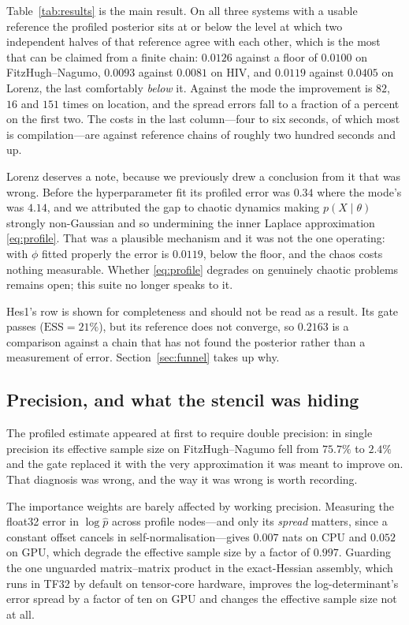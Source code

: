\documentclass[11pt]{article}
\theoremstyle{plain}
\theoremstyle{definition}
\theoremstyle{remark}
\begin{document}
Table~\ref{tab:results} is the main result. On all three systems with a usable reference the
profiled posterior sits at or below the level at which two independent halves of that reference
agree with each other, which is the most that can be claimed from a finite chain: $0.0126$ against
a floor of $0.0100$ on FitzHugh--Nagumo, $0.0093$ against $0.0081$ on HIV, and $0.0119$ against
$0.0405$ on Lorenz, the last comfortably \emph{below} it. Against the mode the improvement is $82$,
$16$ and $151$ times on location, and the spread errors fall to a fraction of a percent on the
first two. The costs in the last column---four to six seconds, of which most is compilation---are against
reference chains of roughly two hundred seconds and up.

Lorenz deserves a note, because we previously drew a conclusion from it that was wrong. Before the
hyperparameter fit its profiled error was $0.34$ where the mode's was $4.14$, and we attributed the
gap to chaotic dynamics making $p(X\mid\theta)$ strongly non-Gaussian and so undermining the inner
Laplace approximation \eqref{eq:profile}. That was a plausible mechanism and it was not the one
operating: with $\phi$ fitted properly the error is $0.0119$, below the floor, and the chaos costs
nothing measurable. Whether \eqref{eq:profile} degrades on genuinely chaotic problems remains open;
this suite no longer speaks to it.

Hes1's row is shown for completeness and should not be read as a result. Its gate passes
($\mathrm{ESS} = 21\%$), but its reference does not converge, so $0.2163$ is a comparison against a
chain that has not found the posterior rather than a measurement of error. Section~\ref{sec:funnel}
takes up why.

\subsection{Precision, and what the stencil was hiding}
\label{sec:precision}

The profiled estimate appeared at first to require double precision: in single precision its
effective sample size on FitzHugh--Nagumo fell from $75.7\%$ to $2.4\%$ and the gate replaced it
with the very approximation it was meant to improve on. That diagnosis was wrong, and the way it
was wrong is worth recording.

The importance weights are barely affected by working precision. Measuring the float32 error in
$\log\hat p$ across profile nodes---and only its \emph{spread} matters, since a constant offset
cancels in self-normalisation---gives $0.007$ nats on CPU and $0.052$ on GPU, which degrade the
effective sample size by a factor of $0.997$. Guarding the one unguarded matrix--matrix product in
the exact-Hessian assembly, which runs in TF32 by default on tensor-core hardware, improves the
log-determinant's error spread by a factor of ten on GPU and changes the effective sample size not
at all.
\end{document}
